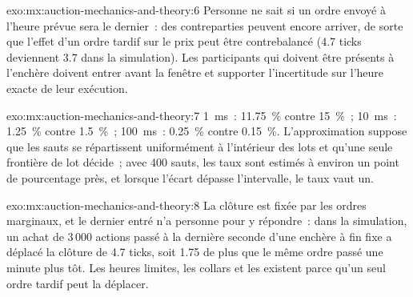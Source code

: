\begin{solution}{exo:mx:auction-mechanics-and-theory:6}
Personne ne sait si un ordre envoyé à l'heure prévue sera le dernier~: des contreparties peuvent encore arriver, de sorte que l'effet d'un ordre tardif sur le prix peut
être contrebalancé (4.7 ticks deviennent 3.7 dans la simulation). Les participants qui doivent être présents à l'enchère doivent entrer avant la fenêtre et supporter l'incertitude
sur l'heure exacte de leur exécution.
\end{solution}

\begin{solution}{exo:mx:auction-mechanics-and-theory:7}
1~ms~: 11.75~\% contre 15~\%~; 10~ms~: 1.25~\% contre 1.5~\%~; 100~ms~: 0.25~\% contre 0.15~\%. L'approximation suppose que les sauts se répartissent uniformément à l'intérieur des lots
et qu'une seule frontière de lot décide~; avec 400 sauts, les taux sont estimés à environ un point de pourcentage près, et lorsque l'écart dépasse l'intervalle, le taux
vaut un.
\end{solution}

\begin{solution}{exo:mx:auction-mechanics-and-theory:8}
La clôture est fixée par les ordres marginaux, et le dernier entré n'a personne pour y répondre~: dans la simulation, un achat de 3\,000 actions passé à la dernière seconde d'une
enchère à fin fixe a déplacé la clôture de 4.7 ticks, soit 1.75 de plus que le même ordre passé une minute plus tôt. Les heures limites, les collars et les  existent parce qu'un seul
ordre tardif peut la déplacer.
\end{solution}

